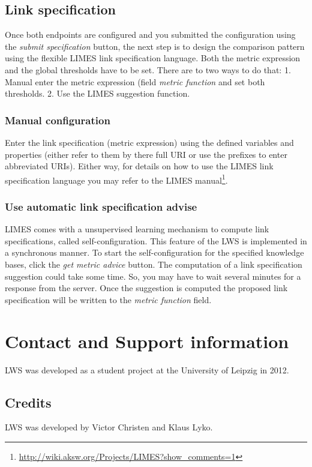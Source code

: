 \documentclass{article}
\begin{document}
\subsection{Link specification}
Once both endpoints are configured and you submitted the configuration using the \textit{submit specification}  button, the next step is to design the comparison pattern using the flexible LIMES link specification language. Both the metric expression and the global thresholds have to be set. There are to two ways to do that: 1. Manual enter the metric expression (field \textit{metric function} and set both thresholds. 2. Use the LIMES suggestion function.\\
\subsubsection{Manual configuration}
Enter the link specification (metric expression) using the defined variables and properties (either refer to them by there full URI or use the prefixes to enter abbreviated URIs). Either way, for details on how to use the LIMES link specification language you may refer to the LIMES manual\footnote{\url{http://wiki.aksw.org/Projects/LIMES?show_comments=1}}.
\subsubsection{Use automatic link specification advise}
LIMES comes with a unsupervised learning mechanism to compute link specifications, called self-configuration. This feature of the LWS is implemented in a synchronous manner. To start the self-configuration for the specified knowledge bases, click the \textit{get metric advice} button. The computation of a link specification suggestion could take some time. So, you may have to wait several minutes for a response from the server. Once the suggestion is computed the proposed link specification will be written to the \textit{metric function} field.

\section{Contact and Support information}
LWS was developed as a student project at the University of Leipzig in 2012.

\subsection{Credits}
LWS was developed by Victor Christen and Klaus Lyko.
\end{document}
